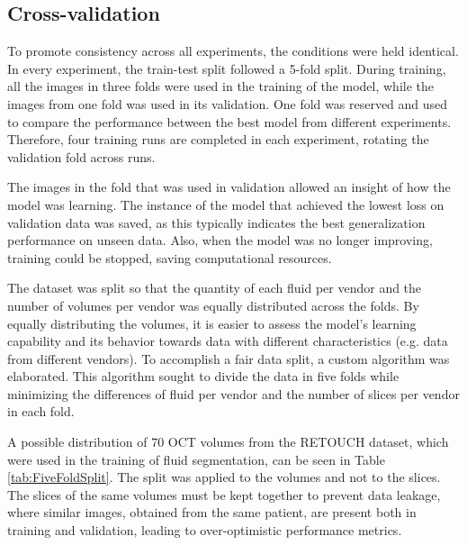 \subsection{Cross-validation}\label{CrossValidation}
To promote consistency across all experiments, the conditions were held identical. In every experiment, the train-test split followed a 5-fold split. During training, all the images in three folds were used in the training of the model, while the images from one fold was used in its validation. One fold was reserved and used to compare the performance between the best model from different experiments. Therefore, four training runs are completed in each experiment, rotating the validation fold across runs.
\par
The images in the fold that was used in validation allowed an insight of how the model was learning. The instance of the model that achieved the lowest loss on validation data was saved, as this typically indicates the best generalization performance on unseen data. Also, when the model was no longer improving, training could be stopped, saving computational resources.
\par
The dataset was split so that the quantity of each fluid per vendor and the number of volumes per vendor was equally distributed across the folds. By equally distributing the volumes, it is easier to assess the model's learning capability and its behavior towards data with different characteristics (e.g. data from different vendors). To accomplish a fair data split, a custom algorithm was elaborated. This algorithm sought to divide the data in five folds while minimizing the differences of fluid per vendor and the number of slices per vendor in each fold.
\par
A possible distribution of 70 OCT volumes from the RETOUCH dataset, which were used in the training of fluid segmentation, can be seen in Table \ref{tab:FiveFoldSplit}. The split was applied to the volumes and not to the slices. The slices of the same volumes must be kept together to prevent data leakage, where similar images, obtained from the same patient, are present both in training and validation, leading to over-optimistic performance metrics.

